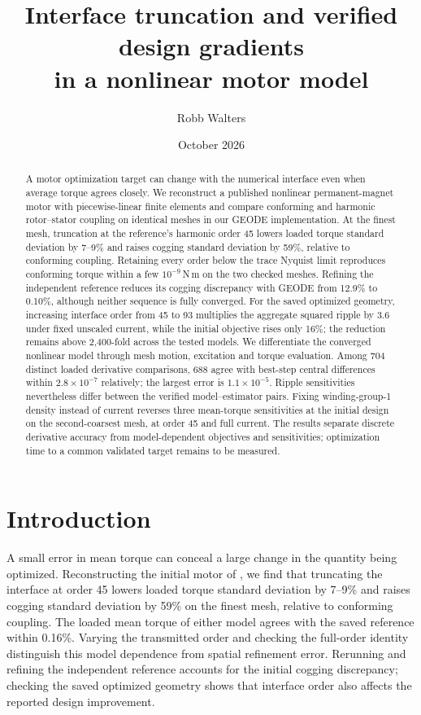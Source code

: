\documentclass{anvil-paper}
\title{Interface truncation and verified design gradients\\
in a nonlinear motor model}
\author{Robb Walters}
\date{October 2026}
\begin{document}
\maketitle
\begin{abstract}
A motor optimization target can change with the numerical interface even
when average torque agrees closely. We reconstruct a published nonlinear
permanent-magnet motor with piecewise-linear finite elements and compare
conforming and harmonic rotor--stator coupling on identical meshes in our
GEODE implementation.
At the finest mesh, truncation at the reference's harmonic order 45 lowers
loaded torque standard deviation by 7--9\% and raises cogging standard
deviation by 59\%, relative to conforming coupling. Retaining every order
below the trace Nyquist limit reproduces conforming torque within a few
$10^{-9}$\,N\,m on the two checked meshes. Refining the independent reference
reduces its cogging discrepancy with GEODE from 12.9\% to 0.10\%, although neither sequence is fully converged.
For the saved optimized geometry, increasing interface order from 45 to 93
multiplies the aggregate squared ripple by 3.6 under fixed unscaled current,
while the initial objective rises only 16\%; the reduction remains above
2,400-fold across the tested models. We differentiate the converged nonlinear model through
mesh motion, excitation and torque evaluation. Among 704 distinct loaded
derivative comparisons, 688 agree with best-step central differences within
$2.8\times10^{-7}$ relatively; the largest error is $1.1\times10^{-5}$.
Ripple sensitivities nevertheless differ between the verified
model--estimator pairs. Fixing winding-group-1 density instead of current
reverses three mean-torque sensitivities at the initial design on the second-coarsest mesh, at order 45 and
full current.
The results separate discrete derivative accuracy from model-dependent
objectives and sensitivities; optimization time to a common validated
target remains to be measured.

\end{abstract}

\section{Introduction}
A small error in mean torque can conceal a large change in the quantity
being optimized. Reconstructing the initial motor of
\citet{wiesheu2024spline}, we find that truncating the interface at order 45
lowers loaded torque standard deviation by 7--9\% and raises cogging
standard deviation by 59\% on the finest mesh, relative to conforming coupling. The loaded
mean torque of either model agrees with the saved reference within 0.16\%.
Varying the transmitted order and checking the full-order identity
distinguish this model dependence from spatial refinement error. Rerunning
and refining the independent reference accounts for the initial cogging
discrepancy; checking the saved optimized geometry shows that interface
order also affects the reported design improvement.
\end{document}
